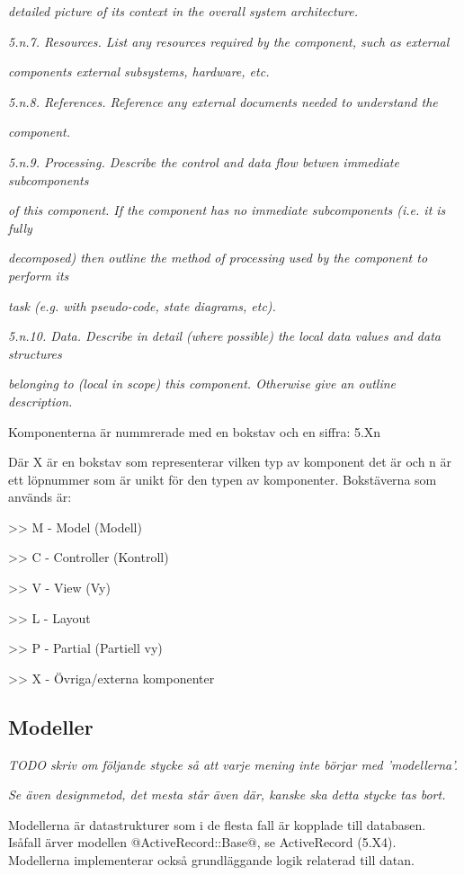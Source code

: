 \documentclass[a4paper, twoside, 11pt, titlepage]{article}
\begin{document}
\emph{detailed picture of its context in the overall system architecture.}

\emph{5.n.7. Resources. List any resources required by the component, such as external}

\emph{components external subsystems, hardware, etc.}

\emph{5.n.8. References. Reference any external documents needed to understand the}

\emph{component.}

\emph{5.n.9. Processing. Describe the control and data flow betwen immediate subcomponents}

\emph{of this component. If the component has no immediate subcomponents (i.e. it is fully}

\emph{decomposed) then outline the method of processing used by the component to perform its}

\emph{task (e.g. with pseudo-code, state diagrams, etc).}

\emph{5.n.10. Data. Describe in detail (where possible) the local data values and data structures}

\emph{belonging to (local in scope) this component. Otherwise give an outline description.}

Komponenterna är nummrerade med en bokstav och en siffra: 5.Xn

Där X är en bokstav som representerar vilken typ av komponent det är och n är ett löpnummer som är unikt för den typen av komponenter. Bokstäverna som används är:

>> M - Model (Modell)

>> C - Controller (Kontroll)

>> V - View (Vy)

>> L - Layout

>> P - Partial (Partiell vy)

>> X - Övriga/externa komponenter

	\subsection{Modeller}


	\emph{TODO skriv om följande stycke så att varje mening inte börjar med 'modellerna'.}

	\emph{Se även designmetod, det mesta står även där, kanske ska detta stycke tas bort.}

	Modellerna är datastrukturer som i de flesta fall är kopplade till databasen. Isåfall ärver modellen @ActiveRecord::Base@, se ActiveRecord (5.X4). Modellerna implementerar också grundläggande logik relaterad till datan.
\end{document}
